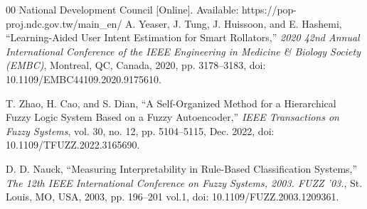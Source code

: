 \documentclass[conference]{IEEEtran}
\begin{document}
\begin{thebibliography}{00}
 National Development Council [Online]. Available: https://pop-proj.ndc.gov.tw/main\_en/
 A. Yeaser, J. Tung, J. Huissoon, and E. Hashemi, ``Learning-Aided User Intent Estimation for Smart Rollators,'' \textit{2020 42nd Annual International Conference of the IEEE Engineering in Medicine \& Biology Society (EMBC)}, Montreal, QC, Canada, 2020, pp. 3178--3183, doi: 10.1109/EMBC44109.2020.9175610.

 T. Zhao, H. Cao, and S. Dian, ``A Self-Organized Method for a Hierarchical Fuzzy Logic System Based on a Fuzzy Autoencoder,'' \textit{IEEE Transactions on Fuzzy Systems}, vol. 30, no. 12, pp. 5104--5115, Dec. 2022, doi: 10.1109/TFUZZ.2022.3165690.

 D. D. Nauck, ``Measuring Interpretability in Rule-Based Classification Systems,'' \textit{The 12th IEEE International Conference on Fuzzy Systems, 2003. FUZZ '03.}, St. Louis, MO, USA, 2003, pp. 196--201 vol.1, doi: 10.1109/FUZZ.2003.1209361.

\end{thebibliography}
\end{document}
